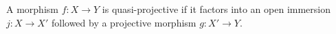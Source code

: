A morphism $f: X \to Y$ is quasi-projective if it factors into an open immersion $j: X \to X'$ followed by a projective morphism $g: X' \to Y$.
